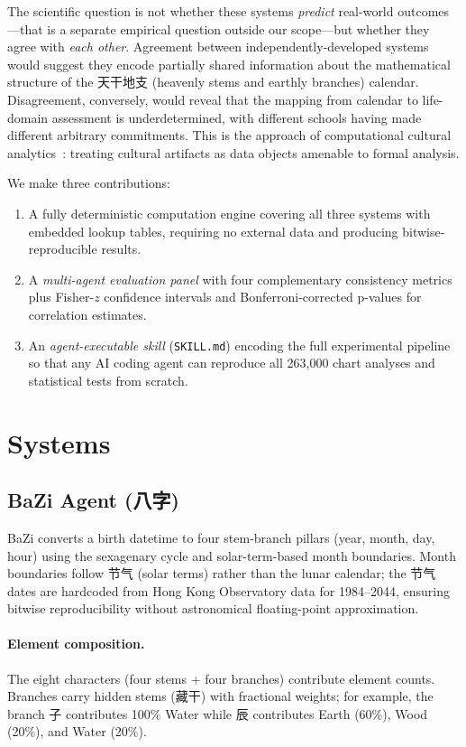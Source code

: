 \documentclass[11pt]{article}
\begin{document}
The scientific question is not whether these systems \emph{predict} real-world outcomes---that is a separate empirical question outside our scope---but whether they agree with \emph{each other}.
Agreement between independently-developed systems would suggest they encode partially shared information about the mathematical structure of the 天干地支 (heavenly stems and earthly branches) calendar.
Disagreement, conversely, would reveal that the mapping from calendar to life-domain assessment is underdetermined, with different schools having made different arbitrary commitments.
This is the approach of computational cultural analytics~\cite{underwood2019distant,moretti2005graphs}: treating cultural artifacts as data objects amenable to formal analysis.

We make three contributions:
\begin{enumerate}
  \item A fully deterministic computation engine covering all three systems with embedded lookup tables, requiring no external data and producing bitwise-reproducible results.
  \item A \emph{multi-agent evaluation panel} with four complementary consistency metrics plus Fisher-$z$ confidence intervals and Bonferroni-corrected p-values for correlation estimates.
  \item An \emph{agent-executable skill} (\texttt{SKILL.md}) encoding the full experimental pipeline so that any AI coding agent can reproduce all 263,000 chart analyses and statistical tests from scratch.
\end{enumerate}

\section{Systems}

\subsection{BaZi Agent (八字)}

BaZi converts a birth datetime to four stem-branch pillars (year, month, day, hour) using the sexagenary cycle and solar-term-based month boundaries.
Month boundaries follow 节气 (solar terms) rather than the lunar calendar; the 节气 dates are hardcoded from Hong Kong Observatory data for 1984--2044, ensuring bitwise reproducibility without astronomical floating-point approximation.

\paragraph{Element composition.}
The eight characters (four stems + four branches) contribute element counts.
Branches carry hidden stems (藏干) with fractional weights; for example, the branch 子 contributes 100\% Water while 辰 contributes Earth (60\%), Wood (20\%), and Water (20\%).
\end{document}
